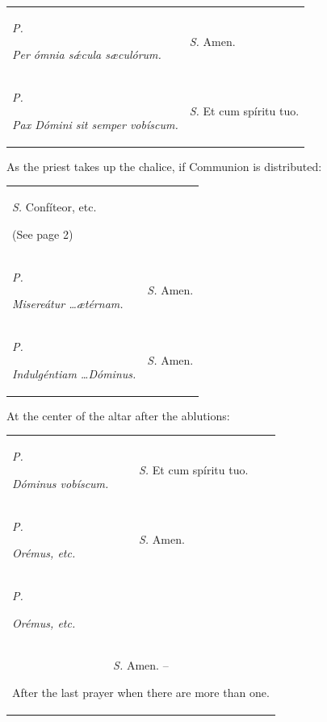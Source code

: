 \documentclass[11pt]{amsbook}
\newcommand{\rubric}[1]{%
        \begin{footnotesize}
                \color{red}
                #1
        \end{footnotesize}
}
\newcommand{\server}[1]{%
        \noindent
        #1
}
\newcommand{\priest}[1]{%
        \begin{raggedright}
                \textit{\noindent\footnotesize #1}
        \end{raggedright}
}
\newcommand{\p}{%
        \noindent
        \textit{\color{red}\small P.}
}
\newcommand{\s}{%
        \noindent
        \textit{\color{red}\small S.}
}
\begin{document}
\vspace{-1.0em}

\begin{longtable}{@{}p{2.25in}@{}p{2.25in}@{}}
        \p \priest{Per ómnia sǽcula sæculórum.}           & \s \server{Amen.}               \\
        \p \priest{Pax Dómini sit semper vobíscum.}       & \s \server{Et cum spíritu tuo.} \\
\end{longtable}

\vspace{-1.0em}

\begin{center}
        {\footnotesize\color{red}As the priest takes up the chalice, if Communion is distributed:} \\        
\end{center}

\vspace{-1.0em}

\begin{longtable}{@{}p{2.25in}@{}p{2.25in}@{}}
        \s \server{Confíteor, etc.} \rubric{(See page 2)} & \\
        \p \priest{Misereátur \ldots \ae térnam.}         & \s \server{Amen.} \\
        \p \priest{Indulgéntiam \ldots Dóminus.}          &  \s \server{Amen.} \\
\end{longtable}


\pagebreak

\begin{center}
        {\footnotesize\color{red}At the center of the altar after the ablutions:} \\
\end{center}

\vspace{-1.0em}

\begin{longtable}{@{}p{2.25in}@{}p{2.25in}@{}}
        \p \priest{Dóminus vobíscum.} & \s \server{Et cum spíritu tuo.}   \\
        \p \priest{Orémus, etc.}      & \s \server{Amen.} \\
        \p \priest{Orémus, etc.}      & \\
        \multicolumn{2}{c}{\s \server{Amen.} -- \rubric{After the last prayer when there are more than one.}} \\
\end{longtable}
\end{document}
